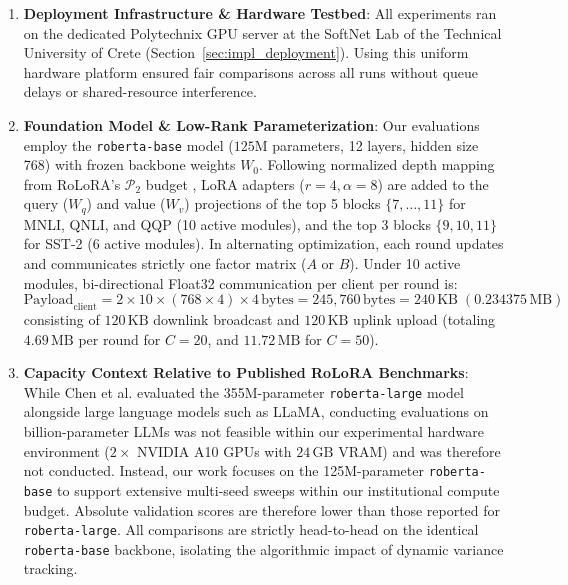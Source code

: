 \begin{enumerate}
    \item \textbf{Deployment Infrastructure \& Hardware Testbed}\label{sec:eval_infrastructure}: 
    All experiments ran on the dedicated Polytechnix GPU server at the SoftNet Lab of the Technical University of Crete (Section~\ref{sec:impl_deployment}). Using this uniform hardware platform ensured fair comparisons across all runs without queue delays or shared-resource interference.

    \item \textbf{Foundation Model \& Low-Rank Parameterization}\label{sec:eval_model_param}: 
    Our evaluations employ the \texttt{roberta\allowbreak-base} model ($125\text{M}$ parameters, 12 layers, hidden size 768) with frozen backbone weights $W_0$. Following normalized depth mapping from RoLoRA's $\mathcal{P}_2$ budget \cite{chen2025robust}, LoRA adapters ($r = 4, \alpha = 8$) are added to the query ($W_q$) and value ($W_v$) projections of the top 5 blocks $\{7, \dots, 11\}$ for MNLI, QNLI, and QQP (10 active modules), and the top 3 blocks $\{9, 10, 11\}$ for SST-2 (6 active modules). In alternating optimization, each round updates and communicates strictly one factor matrix ($A$ or $B$). Under 10 active modules, bi-directional Float32 communication per client per round is:
    \begin{equation}
        \text{Payload}_{\text{client}} = 2 \times 10 \times (768 \times 4) \times 4\,\text{bytes} = 245{,}760\,\text{bytes} = 240\,\text{KB} \; (0.234375\,\text{MB}) \label{eq:payload_formulation}
    \end{equation}
    consisting of $120\,\text{KB}$ downlink broadcast and $120\,\text{KB}$ uplink upload (totaling $4.69\,\text{MB}$ per round for $C = 20$, and $11.72\,\text{MB}$ for $C = 50$).

    \item \textbf{Capacity Context Relative to Published RoLoRA Benchmarks}\label{sec:eval_capacity}: 
    While Chen et al. \cite{chen2025robust} evaluated the 355M-parameter \texttt{roberta-large} model alongside large language models such as LLaMA, conducting evaluations on billion-parameter LLMs was not feasible within our experimental hardware environment ($2 \times$ NVIDIA A10 GPUs with $24\,\text{GB}$ VRAM) and was therefore not conducted. Instead, our work focuses on the 125M-parameter \texttt{roberta-base} to support extensive multi-seed sweeps within our institutional compute budget. Absolute validation scores are therefore lower than those reported for \texttt{roberta-large}. All comparisons are strictly head-to-head on the identical \texttt{roberta-base} backbone, isolating the algorithmic impact of dynamic variance tracking.


\end{enumerate}
